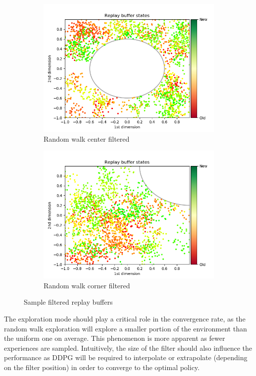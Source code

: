 \documentclass{article}
\begin{document}
\begin{figure}[H]
\begin{subfigure}[b]{0.3\linewidth}
    \includegraphics[width=\linewidth]{Study_2/2.2/visualizations/sequential-center.png}
      \caption{Random walk center filtered}
  \end{subfigure}
   \begin{subfigure}[b]{0.3\linewidth}
    \includegraphics[width=\linewidth]{Study_2/2.4/visualizations/sequential-corner.png}
    \caption{Random walk corner filtered}
  \end{subfigure}
  \label{fig:filter_random_walk}
   \caption{Sample filtered replay buffers}
\end{figure}

The exploration mode should play a critical role in the convergence rate, as the random walk exploration will explore a smaller portion of the environment than the uniform one on average. This phenomenon is more apparent as fewer experiences are sampled. Intuitively, the size of the filter should also influence the performance as DDPG will be required to interpolate or extrapolate (depending on the filter position) in order to converge to the optimal policy.
\end{document}
